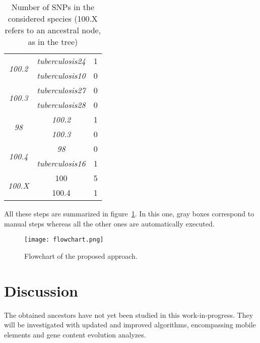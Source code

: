 \documentclass[runningheads,a4paper]{llncs}
\begin{document}
\begin{table}[!htb]
\begin{minipage}{.5\linewidth}
\begin{tabular}{|c|c|c|}
            \multirow{2}{*}{\textit{100.2}}   & \textit{tuberculosis24}  & 1                   \\ %
                                  & \textit{tuberculosis10}  & 0                   \\ \hline 
             \multirow{2}{*}{\textit{100.3}} & \textit{tuberculosis27}       & 0                   \\ %
                                & \textit{tuberculosis28}     & 0                 \\ \hline                     
             \multirow{2}{*}{\textit{98}}   & \textit{100.2}  & 1                   \\ %
                                & \textit{100.3}  & 0                   \\ \hline                     
             \multirow{2}{*}{\textit{100.4}}   & \textit{98}  & 0                   \\ %
                                  & \textit{tuberculosis16}  & 1                   \\ \hline 
                                                                   
              
               \multirow{2}{*}{\textit{100.X}} & 100     & 5                   \\ %
                                & 100.4   & 1                 \\ \hline
         \end{tabular}
    \end{minipage} 
    \caption{Number of SNPs in the considered species (100.X refers to an ancestral node, as in the tree)}
    \label{table:snps}
\end{table}

All these steps are summarized in figure~\ref{fig:flowchart}. In this one, gray boxes correspond to manual steps whereas all the other ones are automatically executed.

\begin{figure}[!htb]
\centering
\texttt{[image: flowchart.png]}
\caption{Flowchart of the proposed approach.}
\label{fig:flowchart}
\end{figure}


\section{Discussion}
\label{results}
The obtained ancestors have not yet been studied in this work-in-progress. They will be investigated with updated and improved algorithms, encompassing mobile elements and gene content evolution analyzes. 
\end{document}
